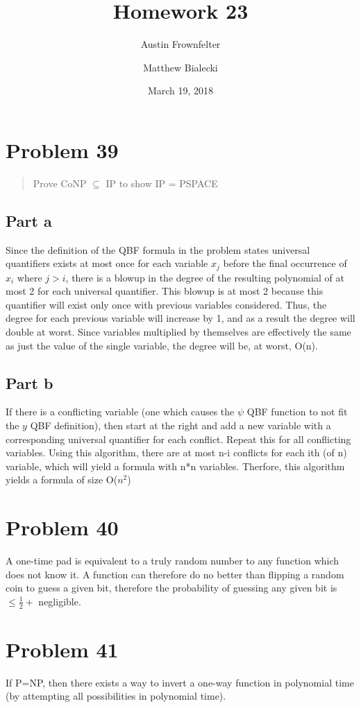 \documentclass{article}
\title{Homework 23}
\author{Austin Frownfelter \and Matthew Bialecki}
\date{March 19, 2018}
\begin{document}
\maketitle

\section{Problem 39}
\begin{quote}
Prove CoNP $\subseteq$ IP to show IP = PSPACE
\end{quote}

\subsection{Part a}
Since the definition of the QBF formula in the problem states universal quantifiers exists at most once for each variable $x_j$ before the final occurrence of $x_i$ where $j>i$, there is a blowup in the degree of the resulting polynomial of at most 2 for each universal quantifier.  This blowup is at most 2 because this quantifier will exist only once with previous variables considered.  Thus, the degree for each previous variable will increase by 1, and as a result the degree will double at worst.  Since variables multiplied by themselves are effectively the same as just the value of the single variable, the degree will be, at worst, O(n).

\subsection{Part b}
If there is a conflicting variable (one which causes the $\psi$ QBF function to not fit the $y$ QBF definition), then start at the right and add a new variable with a corresponding universal quantifier for each conflict.  Repeat this for all conflicting variables.  Using this algorithm, there are at most n-i conflicts for each ith (of n) variable, which will yield a formula with n*n variables.  Therfore, this algorithm yields a formula of size O($n^2$)


\section{Problem 40}
A one-time pad is equivalent to a truly random number to any function which does not know it.  A function can therefore do no better than flipping a random coin to guess a given bit, therefore the probability of guessing any given bit is $\leq \frac12+$ negligible.

\section {Problem 41}
If P=NP, then there exists a way to invert a one-way function in polynomial time (by attempting all possibilities in polynomial time).
\end{document}
